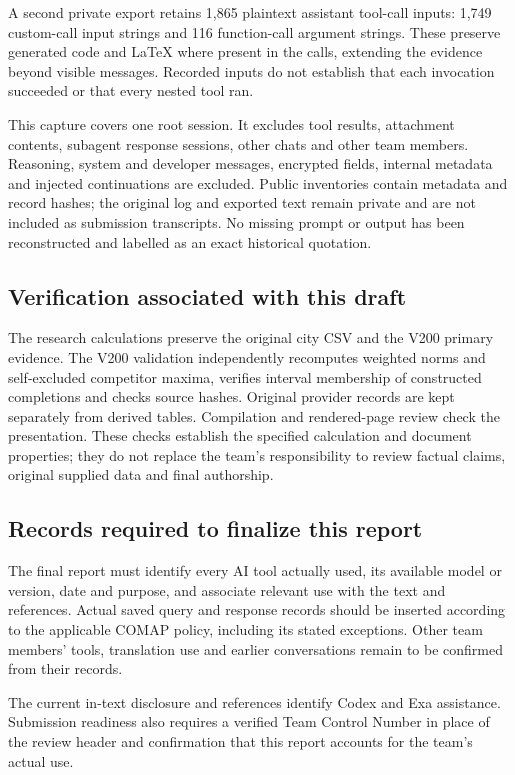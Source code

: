 A second private export retains 1,865 plaintext assistant tool-call inputs:
1,749 custom-call input strings and 116 function-call argument strings.
These preserve generated code and LaTeX where present in the calls, extending
the evidence beyond visible messages. Recorded inputs do not establish that
each invocation succeeded or that every nested tool ran.

This capture covers one root session. It excludes tool results, attachment
contents, subagent response sessions, other chats and other team members.
Reasoning, system and developer messages, encrypted fields, internal metadata
and injected continuations are excluded. Public inventories contain metadata
and record hashes; the original log and exported text remain private and are
not included as submission transcripts. No missing prompt or output has been
reconstructed and labelled as an exact historical quotation.

\subsection*{Verification associated with this draft}
The research calculations preserve the original city CSV and the V200 primary
evidence. The V200 validation independently recomputes weighted norms and
self-excluded competitor maxima, verifies interval membership of constructed
completions and checks source hashes. Original provider records are kept
separately from derived tables. Compilation and rendered-page review check the
presentation. These checks establish the specified calculation and document
properties; they do not replace the team's responsibility to review factual
claims, original supplied data and final authorship.

\subsection*{Records required to finalize this report}
The final report must identify every AI tool actually used, its available
model or version, date and purpose, and associate relevant use with the text
and references. Actual saved query and response records should be inserted
according to the applicable COMAP policy, including its stated exceptions.
Other team members' tools, translation use and earlier conversations remain
to be confirmed from their records.

The current in-text disclosure and references identify Codex and Exa
assistance. Submission readiness also requires a verified Team Control Number
in place of the review header and confirmation that this report accounts for
the team's actual use.
